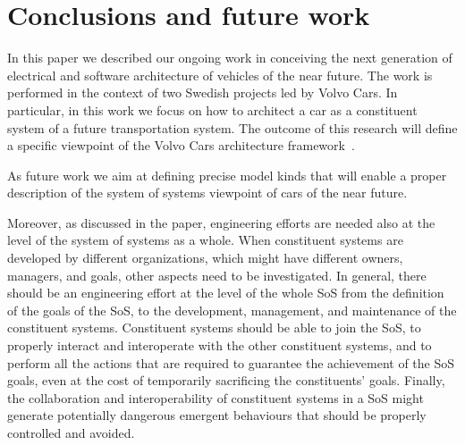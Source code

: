 \section{Conclusions and future work}\label{sec:conclusions}

In this paper we described our ongoing work in conceiving the next generation of electrical and software architecture of vehicles of the near future. The work is performed in the context of two Swedish projects led by Volvo Cars. In particular, in this work we focus on how to architect a car as a constituent system of a future transportation system. The outcome of this research will define a specific viewpoint of the Volvo Cars architecture framework~\cite{JSA2017}.

As future work we aim at defining precise model kinds that will enable a proper description of the system of systems viewpoint of cars of the near future.

Moreover, as discussed in the paper, %
engineering efforts are %
needed also at the level of the system of systems as a whole. When constituent systems are developed by different organizations, which might have different owners, managers, and goals, other aspects need to be investigated. In general, there should be an engineering effort at the level of the whole SoS from the definition of the goals of the SoS, to the development, management, and maintenance of the constituent systems. Constituent systems should be able to join the SoS, to properly interact and interoperate with the other constituent systems, and to perform all the actions that are required to guarantee the achievement of the SoS goals, even at the cost of temporarily sacrificing the constituents' goals. Finally, the collaboration and interoperability of constituent systems in a SoS might generate potentially dangerous emergent behaviours that should be properly controlled and avoided.   

